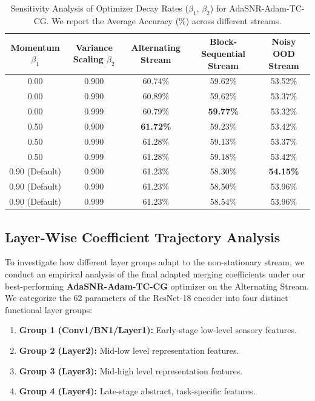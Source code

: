 \documentclass{article}
\theoremstyle{plain}
\theoremstyle{definition}
\theoremstyle{remark}
\begin{document}
\begin{table}[t]
\caption{Sensitivity Analysis of Optimizer Decay Rates ($\beta_1$, $\beta_2$) for AdaSNR-Adam-TC-CG. We report the Average Accuracy (\%) across different streams.}
\label{tab:moments_sweep}
\vskip 0.15in
\begin{center}
\begin{small}
\begin{tabular}{ccccc}
\toprule
\textbf{Momentum $\beta_1$} & \textbf{Variance Scaling $\beta_2$} & \textbf{Alternating Stream} & \textbf{Block-Sequential Stream} & \textbf{Noisy OOD Stream} \\
\midrule
0.00 & 0.900 & 60.74\% & 59.62\% & 53.52\% \\
0.00 & 0.990 & 60.89\% & 59.62\% & 53.37\% \\
0.00 & 0.999 & 60.79\% & \textbf{59.77\%} & 53.32\% \\
\midrule
0.50 & 0.900 & \textbf{61.72\%} & 59.23\% & 53.42\% \\
0.50 & 0.990 & 61.28\% & 59.13\% & 53.37\% \\
0.50 & 0.999 & 61.28\% & 59.18\% & 53.42\% \\
\midrule
0.90 (Default) & 0.900 & 61.23\% & 58.30\% & \textbf{54.15\%} \\
0.90 (Default) & 0.990 & 61.23\% & 58.50\% & 53.96\% \\
0.90 (Default) & 0.999 & 61.23\% & 58.54\% & 53.96\% \\
\bottomrule
\end{tabular}
\end{small}
\end{center}
\vskip -0.1in
\end{table}

\subsection{Layer-Wise Coefficient Trajectory Analysis}
To investigate how different layer groups adapt to the non-stationary stream, we conduct an empirical analysis of the final adapted merging coefficients under our best-performing \textbf{AdaSNR-Adam-TC-CG} optimizer on the Alternating Stream. We categorize the 62 parameters of the ResNet-18 encoder into four distinct functional layer groups:
\begin{enumerate}
    \item \textbf{Group 1 (Conv1/BN1/Layer1):} Early-stage low-level sensory features.
    \item \textbf{Group 2 (Layer2):} Mid-low level representation features.
    \item \textbf{Group 3 (Layer3):} Mid-high level representation features.
    \item \textbf{Group 4 (Layer4):} Late-stage abstract, task-specific features.
\end{enumerate}
\end{document}
